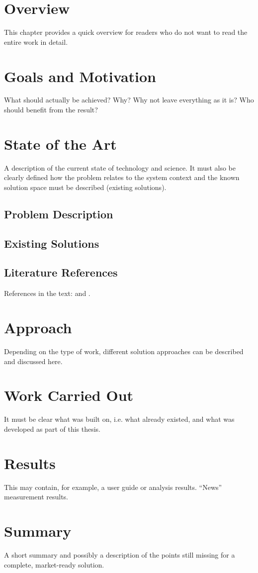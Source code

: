 
\chapter{Overview}
\label{sec:grundl}
This chapter provides a quick overview for readers who do not want to read the
entire work in detail.

\chapter{Goals and Motivation}
\label{sec:real}
What should actually be achieved? Why? Why not leave everything as it is? Who
should benefit from the result?

\chapter{State of the Art}
\label{sec:real-unter}
A description of the current state of technology and science. It must also be
clearly defined how the problem relates to the system context and the known
solution space must be described (existing solutions).

\newpage
\section{Problem Description}
\label{sec:real-unterWeiter}

\newpage
\section{Existing Solutions}
\label{sec:real-unterWeiterNoch}


\section{Literature References}
\label{sec:real-literatur}

References in the text: \cite{doc:stz} and \cite{doc:gun}.

\chapter{Approach}
\label{sec:loesung}
Depending on the type of work, different solution approaches can be described
and discussed here.

\chapter{Work Carried Out}
\label{sec:erledigt}
It must be clear what was built on, i.e. what already existed, and what was
developed as part of this thesis.

\chapter{Results}
\label{sec:ergebnis}
This may contain, for example, a user guide or analysis results.
\enquote{News} measurement results.

\chapter{Summary}
\label{sec:zus}
A short summary and possibly a description of the points still missing for a
complete, market-ready solution.


